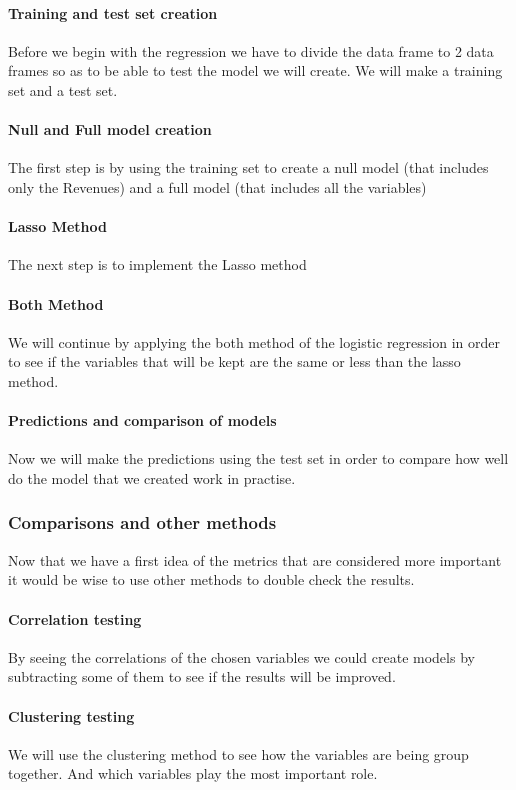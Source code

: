 \documentclass{article}
\begin{document}
\paragraph{Training and test set creation}
Before we begin with the regression we have to divide the data frame to 2 data frames so as to be able to test the model we will create. We will make a training set and a test set.
\paragraph{Null and Full model creation}
The first step is by using the training set to create a null model (that includes only the Revenues) and a full model (that includes all the variables)
\paragraph{Lasso Method}
The next step is to implement the Lasso method
\paragraph{Both Method}
We will continue by applying the both method of the logistic regression in order to see if the variables that will be kept are the same or less than the lasso method.
\paragraph{Predictions and comparison of models}
Now we will make the predictions using the test set in order to compare how well do the model that we created work in practise.
\subsubsection{Comparisons and other methods}
Now that we have a first idea of the metrics that are considered more important it would be wise to use other methods to double check the results.
\paragraph{Correlation testing}
By seeing the correlations of the chosen variables we could create models by subtracting some of them to see if the results will be improved.
\paragraph{Clustering testing}
We will use the clustering method to see how the variables are being group together. And which variables play the most important role.
\end{document}
